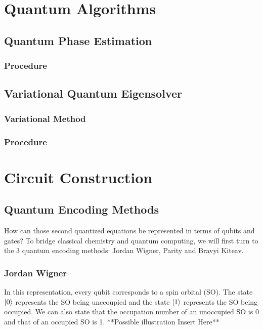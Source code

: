\documentclass{article}
\begin{document}
\section{Quantum Algorithms}
  \subsection{Quantum Phase Estimation}
    \subsubsection{Procedure}
  \subsection{Variational Quantum Eigensolver}
    \subsubsection{Variational Method}

    \subsubsection{Procedure}
\section{Circuit Construction}
  \subsection{Quantum Encoding Methods}
    How can those second quantized equations be represented in terms of
    qubits and gates? To bridge classical chemistry and quantum computing,
    we will first turn to the 3 quantum encoding methods: Jordan Wigner,
    Parity and Bravyi Kiteav.
    \subsubsection{Jordan Wigner}
    In this representation, every qubit corresponds to a spin orbital (SO).
    The state \(\ket{0}\) represents the SO being unccoupied and the state
    \(\ket{1}\) represents the SO being occupied. We can also state that the
    occupation number of an unoccupied SO is 0 and that of an occupied SO
    is 1.
    **Possible illustration
    Insert Here**
\end{document}
